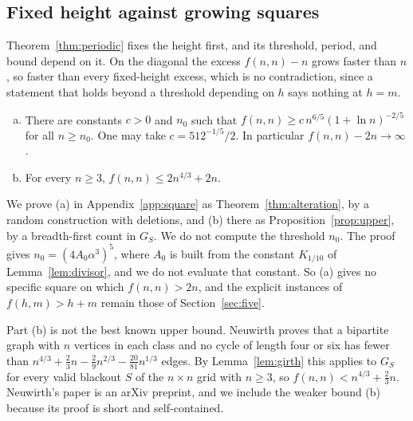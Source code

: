 \subsection{Fixed height against growing squares}

Theorem~\ref{thm:periodic} fixes the height first, and its threshold, period, and bound depend on it. On the diagonal the excess $f(n,n)-n$ grows faster than $n$, so faster than every fixed-height excess, which is no contradiction, since a statement that holds beyond a threshold depending on $h$ says nothing at $h=m$.

\begin{theorem}[squares]\label{thm:square}
\begin{enumerate}[(a)]
\item There are constants $c>0$ and $n_0$ such that $f(n,n)\ge c\,n^{6/5}(1+\ln n)^{-2/5}$ for all $n\ge n_0$. One may take $c=512^{-1/5}/2$. In particular $f(n,n)-2n\to\infty$.
\item For every $n\ge3$, $f(n,n)\le2n^{4/3}+2n$.
\end{enumerate}
\end{theorem}

We prove (a) in Appendix~\ref{app:square} as Theorem~\ref{thm:alteration}, by a random construction with deletions, and (b) there as Proposition~\ref{prop:upper}, by a breadth-first count in $G_S$. We do not compute the threshold $n_0$. The proof gives $n_0=(4A_0\alpha^3)^5$, where $A_0$ is built from the constant $K_{1/10}$ of Lemma~\ref{lem:divisor}, and we do not evaluate that constant. So (a) gives no specific square on which $f(n,n)>2n$, and the explicit instances of $f(h,m)>h+m$ remain those of Section~\ref{sec:five}.

\begin{remark}\label{rem:neuwirth}
Part (b) is not the best known upper bound. Neuwirth \cite[Corollary~16]{neuwirth2001} proves that a bipartite graph with $n$ vertices in each class and no cycle of length four or six has fewer than $n^{4/3}+\frac23n-\frac29n^{2/3}-\frac{20}{81}n^{1/3}$ edges. By Lemma~\ref{lem:girth} this applies to $G_S$ for every valid blackout $S$ of the $n\times n$ grid with $n\ge3$, so $f(n,n)<n^{4/3}+\frac23n$. Neuwirth's paper is an arXiv preprint, and we include the weaker bound (b) because its proof is short and self-contained.
\end{remark}
